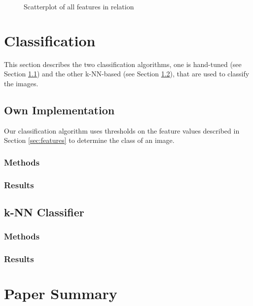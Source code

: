 \documentclass[a4paper,psfig,subfigure,epsfig,fleqn,amssmb,float,caption,fontenc,ausarbeitung]{article}
\begin{document}
\begin{figure}
	\centering
	\setlength\figureheight{4cm} 
	\setlength\figurewidth{10cm}
	
	\caption{Scatterplot of all features in relation}
	\label{fig:gscatter}
\end{figure}





\section{Classification}
\label{sec:classification}
This section describes the two classification algorithms, one is hand-tuned (see Section \ref{sec:own}) and the other k-NN-based (see Section \ref{sec:kNN}), that are used to classify the images. 

\subsection{Own Implementation}
\label{sec:own}
Our classification algorithm uses thresholds on the feature values described in Section \ref{sec:features} to determine the class of an image.

\subsubsection{Methods}
\label{sec:ownMethods}

\subsubsection{Results}
\label{sec:ownResults}

\subsection{k-NN Classifier}
\label{sec:kNN}

\subsubsection{Methods}
\label{sec:kNNMethods}

\subsubsection{Results}
\label{sec:kNNResults}

\section{Paper Summary}
\label{sec:paperSummary}
\cite{beyer1999nearest}
\end{document}
